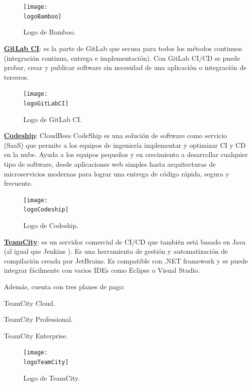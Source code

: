 \begin{compactitem}
    \begin{figure}[h]
        \centering
        \texttt{[image: \\logoBamboo]}
        \caption{Logo de Bamboo.}
    \end{figure}
    \item \textbf{\underline{GitLab CI}}: es la parte de GitLab que secusa para todos los métodos continuos (integración continua, entrega e implementación). Con GitLab CI/CD se puede probar, crear y publicar software sin necesidad de una aplicación o integración de terceros.
    \begin{figure}[h]
        \centering
        \texttt{[image: \\logoGitLabCI]}
        \caption{Logo de GitLab CI.}
    \end{figure}
    \item \textbf{\underline{Codeship}}: CloudBees CodeShip es una solución de software como servicio (SaaS) que permite a los equipos de ingeniería implementar y optimizar CI y CD en la nube. Ayuda a los equipos pequeños y en crecimiento a desarrollar cualquier tipo de software, desde aplicaciones web simples hasta arquitecturas de microservicios modernas para lograr una entrega de código rápida, segura y frecuente.
    
    \begin{figure}[h]
        \centering
        \texttt{[image: \\logoCodeship]}
        \caption{Logo de Codeship.}
    \end{figure}

    \item \textbf{\underline{TeamCity}}: es un servidor comercial de CI/CD que también está basado en Java (al igual que Jenkins \cite{jenkins_teamcity}). Es una herramienta de gestión y automatización de compilación creada por JetBrains.
    Es compatible con .NET framework y se puede integrar fácilmente con varios IDEs como Eclipse o Visual Studio.
    
    Además, cuenta con tres planes de pago:
    \begin{compactitem}
        \item TeamCity Cloud.
        \item TeamCity Professional.
        \item TeamCity Enterprise.
    \end{compactitem}

    \begin{figure}[h]
        \centering
        \texttt{[image: \\logoTeamCity]}
        \caption{Logo de TeamCity.}
    \end{figure}


\end{compactitem}
